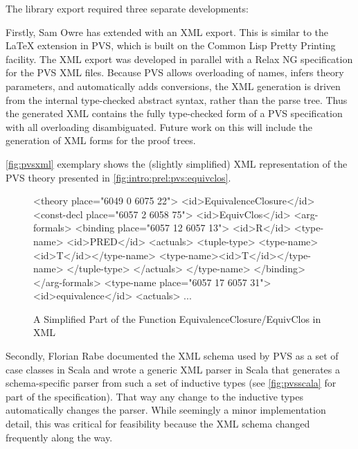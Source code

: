 The \pvs library export required three separate developments:

Firstly, Sam Owre has extended \pvs with an XML export.  This is similar to the {\LaTeX}
extension in PVS, which is built on the Common Lisp Pretty Printing facility.  The XML
export was developed in parallel with a Relax NG specification for the PVS XML files.
Because PVS allows overloading of names, infers theory parameters, and automatically adds
conversions, the XML generation is driven from the internal type-checked abstract syntax,
rather than the parse tree.  Thus the generated XML contains the fully type-checked form
of a PVS specification with all overloading disambiguated.  Future work on this will
include the generation of XML forms for the proof trees.

\autoref{fig:pvsxml} exemplary shows the (slightly simplified) XML representation of the PVS theory presented in \autoref{fig:intro:prel:pvs:equivclos}.

\begin{figure}[ht]\centering
\begin{code}
 <theory place="6049 0 6075 22">
  <id>EquivalenceClosure</id>
  <const-decl place="6057 2 6058 75">
    <id>EquivClos</id>
    <arg-formals>
      <binding place="6057 12 6057 13">
        <id>R</id>
        <type-name>
          <id>PRED</id>
          <actuals>
            <tuple-type>
              <type-name><id>T</id></type-name>
              <type-name><id>T</id></type-name>
            </tuple-type>
          </actuals>
        </type-name>
      </binding>
    </arg-formals>
    <type-name place="6057 17 6057 31">
      <id>equivalence</id>
      <actuals>
        ...
\end{code}
\caption{A Simplified Part of the Function EquivalenceClosure/EquivClos in XML \protect\footnotemark}\label{fig:pvsxml}
\end{figure}

Secondly, Florian Rabe documented the XML schema used by PVS as a set of case classes in Scala and wrote a generic XML parser in Scala that
generates a schema-specific parser from such a set of inductive types (see
\autoref{fig:pvsscala} for part of the specification).  That way any change to the
inductive types automatically changes the parser.  While seemingly a minor implementation
detail, this was critical for feasibility because the XML schema changed frequently along
the way.

